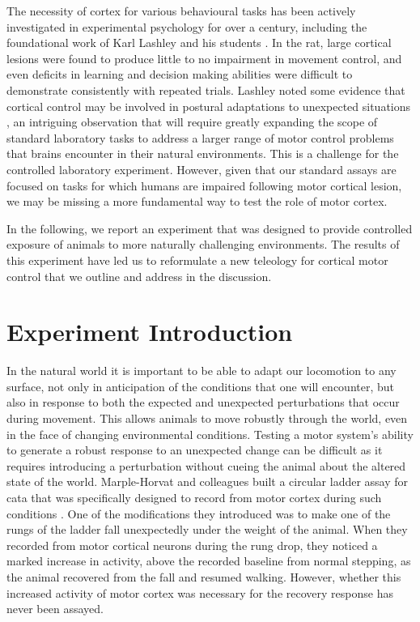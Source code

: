 The necessity of cortex for various behavioural tasks has been actively investigated in experimental psychology for over a century, including the foundational work of Karl Lashley and his students \cite{Lashley1950a}. In the rat, large cortical lesions were found to produce little to no impairment in movement control, and even deficits in learning and decision making abilities were difficult to demonstrate consistently with repeated trials. Lashley noted some evidence that cortical control may be involved in postural adaptations to unexpected situations \cite{Lashley1921a}, an intriguing observation that will require greatly expanding the scope of standard laboratory tasks to address a larger range of motor control problems that brains encounter in their natural environments. This is a challenge for the controlled laboratory experiment. However, given that our standard assays are focused on tasks for which humans are impaired following motor cortical lesion, we may be missing a more fundamental way to test the role of motor cortex.

In the following, we report an experiment that was designed to provide controlled exposure of animals to more naturally challenging environments. The results of this experiment have led us to reformulate a new teleology for cortical motor control that we outline and address in the discussion.

\section{Experiment Introduction}

In the natural world it is important to be able to adapt our locomotion to any surface, not only in anticipation of the conditions that one will encounter, but also in response to both the expected and unexpected perturbations that occur during movement. This allows animals to move robustly through the world, even in the face of changing environmental conditions. Testing a motor system's ability to generate a robust response to an unexpected change can be difficult as it requires introducing a perturbation without cueing the animal about the altered state of the world. Marple-Horvat and colleagues built a circular ladder assay for cata that was specifically designed to record from motor cortex during such conditions \cite{Marple-Horvat1993}. One of the modifications they introduced was to make one of the rungs of the ladder fall unexpectedly under the weight of the animal. When they recorded from motor cortical neurons during the rung drop, they noticed a marked increase in activity, above the recorded baseline from normal stepping, as the animal recovered from the fall and resumed walking. However, whether this increased activity of motor cortex was necessary for the recovery response has never been assayed.

